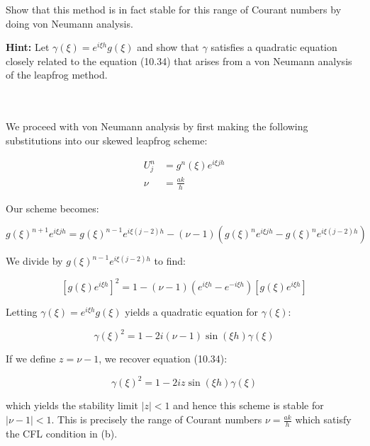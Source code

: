 Show that this method is in fact stable for this range of Courant numbers by doing von Neumann analysis.

\textbf{Hint:} Let $\gamma(\xi) = e^{i \xi h} g(\xi)$ and show that $\gamma$ satisfies a quadratic equation closely
related to the equation (10.34) that arises from a von Neumann analysis of the leapfrog method.

\begin{solution}\ \\\\
    We proceed with von Neumann analysis by first making the following substitutions into our skewed leapfrog scheme:

    \begin{align*}
        U_j^n &= g^n(\xi) e^{i \xi jh} \\
        \nu &= \frac{ak}{h}
    \end{align*}

    Our scheme becomes:

    $$
    g(\xi)^{n+1} e^{i \xi jh} = g(\xi)^{n-1} e^{i \xi (j-2) h} - (\nu - 1) \left(g(\xi)^{n} e^{i \xi jh} - g(\xi)^{n} e^{i \xi (j-2) h}\right)
    $$

    We divide by $g(\xi)^{n-1} e^{i \xi (j-2) h}$ to find:

    $$
    \left[g(\xi) e^{i \xi h} \right]^2 = 1 - (\nu - 1)\left(e^{i \xi h} - e^{-i \xi h} \right)\left[ g(\xi) e^{i \xi h} \right]
    $$

    Letting $\gamma(\xi) = e^{i \xi h}g(\xi)$ yields a quadratic equation for $\gamma(\xi)$:

    $$
    \gamma(\xi)^2 = 1 - 2i(\nu - 1)\sin{(\xi h)}\gamma(\xi)
    $$
   
    If we define $z = \nu - 1$, we recover equation (10.34):

    $$
    \gamma(\xi)^2 = 1 - 2iz\sin{(\xi h)}\gamma(\xi)
    $$

    which yields the stability limit $|z| < 1$ and hence this scheme is stable for $|\nu - 1| < 1$. This is precisely 
    the range of Courant numbers $\nu = \frac{ak}{h}$ which satisfy the CFL condition in (b).
    \ \\
\end{solution}